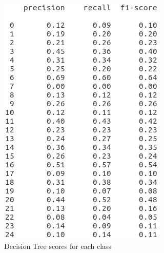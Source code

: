 \documentclass{article} %
\begin{document}
\begin{figure}[H]
	\includegraphics[width=\linewidth]{dc_score.png}
	\caption{Decision Tree scores for each class}\label{fig:dc_score.png}
	\endminipage\hfill\hfill\hfill\hfill\hfill\hfill

\end{figure}
\end{document}
